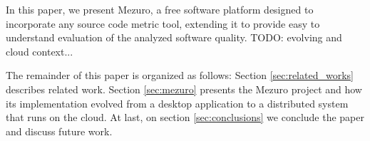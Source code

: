In this paper, we present Mezuro, a free software platform
designed to incorporate any source code metric tool, extending it to provide
easy to understand evaluation of the analyzed software quality. 
TODO: evolving and cloud context...

The remainder of this paper is organized as follows: Section
\ref{sec:related_works} describes related work.  Section \ref{sec:mezuro}
presents the Mezuro project and how its implementation evolved from a desktop
application to a distributed system that runs on the cloud.  At last, on
section \ref{sec:conclusions} we conclude the paper and discuss future work.

